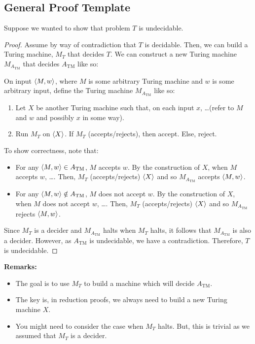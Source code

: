 \documentclass[letterpaper]{article}
\begin{document}
\subsection{General Proof Template}
Suppose we wanted to show that problem $T$ is undecidable. 
\begin{mdframed}[]
    \begin{proof}
        Assume by way of contradiction that $T$ is decidable. Then, we can build a Turing machine, $M_T$ that decides $T$. We can construct a new Turing machine $M_{A_{\text{TM}}}$ that decides $A_{\text{TM}}$ like so:
        \begin{mdframed}[]
            On input $\langle M, w \rangle$, where $M$ is some arbitrary Turing machine and $w$ is some arbitrary input, define the Turing machine $M_{A_{\text{TM}}}$ like so: 
            \begin{enumerate}
                \item Let $X$ be another Turing machine such that, on each input $x$, \dots (refer to $M$ and $w$ and possibly $x$ in some way).
                \item Run $M_T$ on $\langle X \rangle$. If $M_T$ (accepts/rejects), then accept. Else, reject.
            \end{enumerate}
        \end{mdframed}
        To show correctness, note that: 
        \begin{itemize}
            \item For any $\langle M, w \rangle \in A_{\text{TM}}$, $M$ accepts $w$. By the construction of $X$, when $M$ accepts $w$, \dots. Then, $M_T$ (accepts/rejects) $\langle X \rangle$ and so $M_{A_{\text{TM}}}$ accepts $\langle M, w \rangle$. 
            \item For any $\langle M, w \rangle \notin A_{\text{TM}}$, $M$ does not accept $w$. By the construction of $X$, when $M$ does not accept $w$, \dots. Then, $M_T$ (accepts/rejects) $\langle X \rangle$ and so $M_{A_{\text{TM}}}$ rejects $\langle M, w \rangle$. 
        \end{itemize}
        Since $M_T$ is a decider and $M_{A_{\text{TM}}}$ halts when $M_T$ halts, it follows that $M_{A_{\text{TM}}}$ is also a decider. However, as $A_{\text{TM}}$ is undecidable, we have a contradiction. Therefore, $T$ is undecidable. 
    \end{proof}
\end{mdframed}
\textbf{Remarks:}
\begin{itemize}
    \item The goal is to use $M_T$ to build a machine which will decide $A_{\text{TM}}$.
    \item The key is, in reduction proofs, we always need to build a new Turing machine $X$.
    \item You might need to consider the case when $M_T$ halts. But, this is trivial as we assumed that $M_T$ is a decider.  
\end{itemize}
\end{document}
